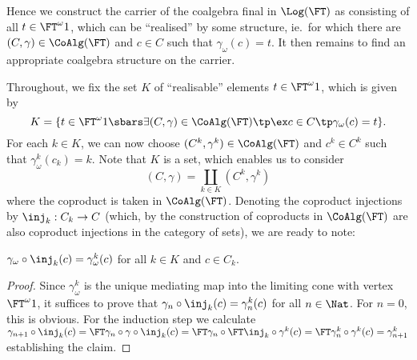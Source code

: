\documentclass{entcs}
\begin{document}
\pskip Hence we construct the carrier of the coalgebra final in
$\Log(\FT)$ as consisting of all $t \in \FT^{\omega} 1$, which can be
``realised'' by some structure, ie.\ for which there are $(C, \gamma)
\in \CoAlg(\FT)$ and $c \in C$ such that $\gamma_{\omega}(c) = t$. It
then remains to find an appropriate coalgebra structure on the
carrier. 

\mmskip Throughout, we fix the set $K$ of ``realisable'' elements $t
\in \FT^{\omega} 1$, which is given by
%
\[
  K = \lbrace t \in \FT^{\omega} 1 \sbars \exists (C, \gamma) \in \CoAlg(\FT)\tp \ex c
        \in C\tp \gamma_{\omega}(c) = t \rbrace.
\]
%
For each $k \in K$, we can now choose $(C^k, \gamma^k) \in \CoAlg(\FT)$ and $c^k
\in C^k$ such that $\gamma_{\omega}^k(c_k) = k$. Note that $K$ is a set, which
enables us to consider
\[
  (C,\gamma) = \coprod_{k \in K} (C^k, \gamma^k)
\]
where the coproduct is taken in $\CoAlg(\FT)$.
%
Denoting the coproduct injections by $\inj_k: C_k \to C$ (which, by
the construction of coproducts in $\CoAlg(\FT)$ are also coproduct
injections in the category of sets), we are ready to note:

\begin{lemma}
$\gamma_{\omega} \circ \inj_k(c) = \gamma^k_{\omega} (c)$ for all $k \in K$ and
$c \in C_k$.
\end{lemma}
%
\begin{proof}
  Since $\gamma^k_{\omega}$ is the unique mediating map into the limiting cone
  with vertex $\FT^{\omega} 1$, it suffices to prove that $\gamma_n \circ
  \inj_k (c) = \gamma_n^k(c)$ for all $n \in \Nat$. For $n = 0$, this is
  obvious. For the induction step we calculate 
%
$\gamma_{n+1} \circ \inj_k (c)%
  = %
    \FT \gamma_n \circ \gamma \circ \inj_k(c)%
  = %
    \FT \gamma_n \circ \FT \inj_k \circ \gamma^k(c) %
  = %
    \FT \gamma_n^k \circ \gamma^k(c) %
  = \gamma_{n+1}^k $
establishing the claim.
\end{proof}
\end{document}
